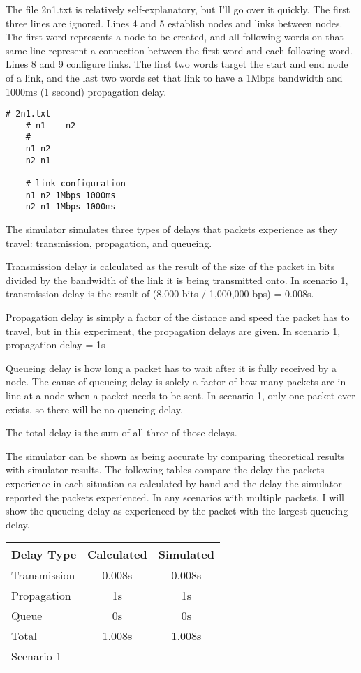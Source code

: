 \documentclass[11pt]{article}
\begin{document}
The file 2n1.txt is relatively self-explanatory, but I'll go over it quickly. The first three lines are ignored. Lines 4 and 5 establish nodes and links between nodes. The first word represents a node to be created, and all following words on that same line represent a connection between the first word and each following word. Lines 8 and 9 configure links. The first two words target the start and end node of a link, and the last two words set that link to have a 1Mbps bandwidth and 1000ms (1 second) propagation delay.

\begin{lstlisting}
# 2n1.txt
    # n1 -- n2
    #
    n1 n2
    n2 n1

    # link configuration
    n1 n2 1Mbps 1000ms
    n2 n1 1Mbps 1000ms
\end{lstlisting}

The simulator simulates three types of delays that packets experience as they travel: transmission, propagation, and queueing. 

Transmission delay is calculated as the result of the size of the packet in bits divided by the bandwidth of the link it is being transmitted onto. In scenario 1, transmission delay is the result of (8,000 bits / 1,000,000 bps) = 0.008s.

Propagation delay is simply a factor of the distance and speed the packet has to travel, but in this experiment, the propagation delays are given. In scenario 1, propagation delay = 1s

Queueing delay is how long a packet has to wait after it is fully received by a node. The cause of queueing delay is solely a factor of how many packets are in line at a node when a packet needs to be sent. In scenario 1, only one packet ever exists, so there will be no queueing delay.

The total delay is the sum of all three of those delays.

The simulator can be shown as being accurate by comparing theoretical results with simulator results. The following tables compare the delay the packets experience in each situation as calculated by hand and the delay the simulator reported the packets experienced. In any scenarios with multiple packets, I will show the queueing delay as experienced by the packet with the largest queueing delay.

\vspace{0.5cm}
\begin{tabular}{lcc}
  \toprule
  Delay Type & Calculated & Simulated\\
  \midrule
  Transmission & 0.008s & 0.008s\\
  Propagation & 1s & 1s\\
  Queue & 0s & 0s\\
  Total & 1.008s & 1.008s\\
  \bottomrule
  Scenario 1
\end{tabular}
\vspace{0.5cm}
\end{document}
